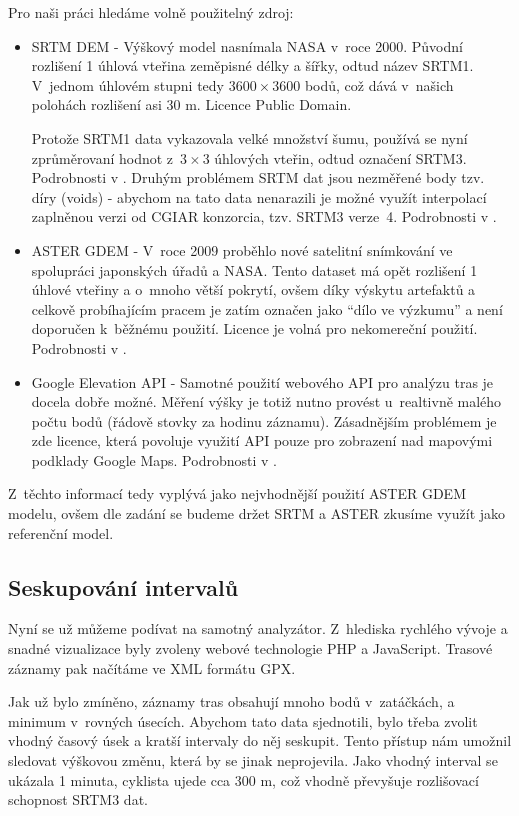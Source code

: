 \documentclass[thesis=B,czech]{FITthesis}[2012/06/26]
\begin{document}
Pro naši práci hledáme volně použitelný zdroj:
\begin{itemize}
\item{SRTM DEM - Výškový model nasnímala NASA v~roce 2000. Původní rozlišení 1 úhlová vteřina zeměpisné délky a šířky, odtud název SRTM1. V~jednom úhlovém stupni tedy $3600 \times 3600$ bodů, což dává v~našich polohách rozlišení asi 30 m. Licence Public Domain.

Protože SRTM1 data vykazovala velké množství šumu, používá se nyní zprůměrovaní hodnot z~$3 \times 3$ úhlových vteřin, odtud označení SRTM3. Podrobnosti v  \cite{dem-srtm}. Druhým problémem SRTM dat jsou nezměřené body tzv. díry (voids) - abychom na tato data nenarazili je možné využít interpolací zaplněnou verzi od CGIAR konzorcia, tzv. SRTM3 verze~4. Podrobnosti v \cite{dem-srtm-cgiar}.
}

\item{ASTER GDEM - V~roce 2009 proběhlo nové satelitní snímkování ve spolupráci japonských úřadů a NASA. Tento dataset má opět rozlišení 1 úhlové vteřiny a o~mnoho větší pokrytí, ovšem díky výskytu artefaktů a celkově probíhajícím pracem je zatím označen jako “dílo ve výzkumu” a není doporučen k~běžnému použití. Licence je volná pro nekomereční použití. Podrobnosti v \cite{dem-aster}.}

\item{Google Elevation API - Samotné použití webového API pro analýzu tras je docela dobře možné. Měření výšky je totiž nutno provést u~realtivně malého počtu bodů (řádově stovky za hodinu záznamu). Zásadnějším problémem je zde licence, která povoluje využití API pouze pro zobrazení nad mapovými podklady Google Maps. Podrobnosti v \cite{dem-google}.}
\end{itemize}

Z~těchto informací tedy vyplývá jako nejvhodnější použití ASTER GDEM modelu, ovšem dle zadání se budeme držet SRTM a ASTER zkusíme využít jako referenční model.

\subsection{Seskupování intervalů} 
\label{seskupovani}
Nyní se už můžeme podívat na samotný analyzátor. Z~hlediska rychlého vývoje a snadné vizualizace byly zvoleny webové technologie PHP a JavaScript. Trasové záznamy pak načítáme ve XML formátu GPX.


Jak už bylo zmíněno, záznamy tras obsahují mnoho bodů v~zatáčkách, a minimum v~rovných úsecích. Abychom tato data sjednotili, bylo třeba zvolit vhodný časový úsek a kratší intervaly do něj seskupit. Tento přístup nám umožnil sledovat výškovou změnu, která by se jinak neprojevila. Jako vhodný interval se ukázala 1 minuta, cyklista ujede cca 300 m, což vhodně převyšuje rozlišovací schopnost SRTM3 dat.
\end{document}
